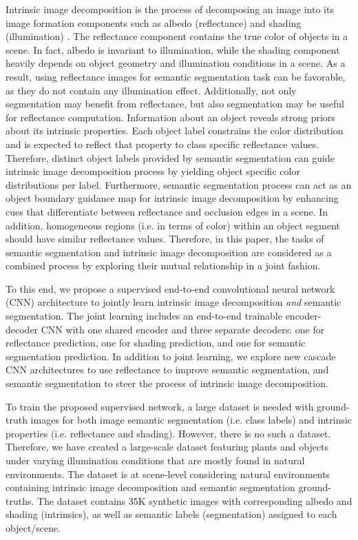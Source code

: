 \documentclass[runningheads]{llncs}
\begin{document}
Intrinsic image decomposition is the process of decomposing an image into its image formation components such as albedo (reflectance) and shading (illumination) \cite{land}. The reflectance component contains the true color of objects in a scene. In fact, albedo is invariant to illumination, while the shading component heavily depends on object geometry and illumination conditions in a scene. As a result, using reflectance images for semantic segmentation task can be favorable, as they do not contain any illumination effect. Additionally, not only segmentation may benefit from reflectance, but also segmentation may be useful for reflectance computation. Information about an object reveals strong priors about its intrinsic properties. Each object label constrains the color distribution and is expected to reflect that property to class specific reflectance values. Therefore, distinct object labels provided by semantic segmentation can guide intrinsic image decomposition process by yielding object specific color distributions per label. Furthermore, semantic segmentation process can act as an object boundary guidance map for intrinsic image decomposition by enhancing cues that differentiate between reflectance and occlusion edges in a scene. In addition, homogeneous regions (i.e. in terms of color) within an object segment should have similar reflectance values. Therefore, in this paper, the tasks of semantic segmentation and intrinsic image decomposition are considered as a combined process by exploring their mutual relationship in a joint fashion. 

To this end, we propose a supervised end-to-end convolutional neural network (CNN) architecture to jointly learn intrinsic image decomposition {\em and} semantic segmentation. The joint learning includes an end-to-end trainable encoder-decoder CNN with one shared encoder and three separate decoders: one for reflectance prediction, one for shading prediction, and one for semantic segmentation prediction. In addition to joint learning, we explore new cascade CNN architectures to use reflectance to improve semantic segmentation, and semantic segmentation to steer the process of intrinsic image decomposition. 

To train the proposed supervised network, a large dataset is needed with ground-truth images for both image semantic segmentation (i.e. class labels) and intrinsic properties (i.e. reflectance and shading). However, there is no such a dataset. Therefore, we have created a large-scale dataset featuring plants and objects under varying illumination conditions that are mostly found in natural environments. The dataset is at scene-level considering natural environments containing intrinsic image decomposition and semantic segmentation ground-truths. The dataset contains 35K synthetic images with corresponding albedo and shading (intrinsics), as well as semantic labels (segmentation) assigned to each object/scene. 
\end{document}
